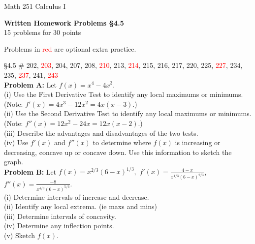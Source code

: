 \documentclass[11pt]{report}
\theoremstyle{plain}
\newcommand{\opt}[1]{\textcolor{red}{#1}}
\begin{document}
\hfill Math 251 Calculus I
\begin{center}
\Large{\textbf{Written Homework Problems \S 4.5}} \\
15 problems for 30 points\\
\end{center}

Problems in \textcolor{red}{red} are optional extra practice.\\

\begin{description}
\item{\S 4.5} \# 202, \opt{203}, 204, 207, 208, \opt{210}, 213, \opt{214}, 215, 216, 217, 220, 225, \opt{227}, 234, 235, \opt{237}, 241, \opt{243}\\

\textbf{Problem A:} Let $f(x)=x^4-4x^3.$\\
(i) Use the First Derivative Test to identify any local maximums or minimums. (Note: $f'(x)=4x^3-12x^2=4x(x-3).$)\\
(ii) Use the Second Derivative Test to identify any local maximums or minimums. (Note: $f''(x)=12x^2-24x=12x(x-2)$.)\\
(iii) Describe the advantages and disadvantages of the two tests.\\
(iv) Use $f'(x)$ and $f''(x)$ to determine where $f(x)$ is increasing or decreasing, concave up or concave down. Use this information to sketch the graph.\\


\textbf{Problem B:} Let $\displaystyle f(x)=x^{2/3}(6-x)^{1/3},$ $\displaystyle f'(x)= \frac{4-x}{x^{1/3}(6-x)^{2/3}}$, $\displaystyle  f''(x)=\frac{-8}{x^{4/3}(6-x)^{5/3}}.$\\
(i) Determine intervals of increase and decrease.\\
(ii) Identify any local extrema. (ie maxs and mins)\\
(iii) Determine intervals of concavity.\\
(iv) Determine any inflection points.\\
(v) Sketch $f(x).$\\

\end{description}
\end{document}
